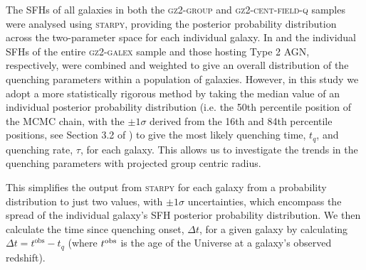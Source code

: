 \documentclass[useAMS,usenatbib]{mn2e}
\begin{document}
The SFHs of all galaxies in both the \textsc{gz2-group} and \textsc{gz2-cent-field-q} samples were analysed using \textsc{starpy}, providing the posterior probability distribution across the two-parameter space for each individual galaxy. In \cite{smethurst15} and \cite{smethurst16} the individual SFHs of the entire \textsc{gz2-galex} sample and those hosting Type 2 AGN, respectively, were combined and weighted to give an overall distribution of the quenching parameters within a population of galaxies. However, in this study we adopt a more statistically rigorous method by taking the median value of an individual posterior probability distribution (i.e. the 50th percentile position of the MCMC chain, with the $\pm1\sigma$ derived from the 16th and 84th percentile positions, see Section 3.2 of \citealt{smethurst15}) to give the most likely quenching time, $t_{q}$, and quenching rate, $\tau$, for each galaxy. This allows us to investigate the trends in the quenching parameters with projected group centric radius. 

This simplifies the output from \textsc{starpy} for each galaxy from a probability distribution to just two values, with $\pm1\sigma$ uncertainties, which encompass the spread of the individual galaxy's SFH posterior probability distribution. We then calculate the time since quenching onset, $\Delta t$, for a given galaxy by calculating {\bf $\Delta t = t^\mathrm{obs} - t_{q}$} (where $t^{\rm{obs}}$ is the age of the Universe at a galaxy's observed redshift). 
\end{document}
